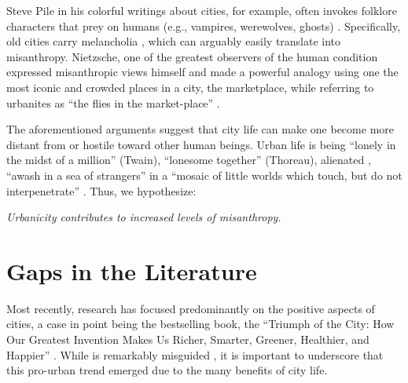 \documentclass[11pt, letterpaper]{article}
\begin{document}
\begin{spacing}{1.4}
Steve Pile in his colorful writings about cities, for example, often invokes
folklore characters that prey on humans (e.g., vampires, werewolves, ghosts)  \citep{pile05,pile05B,pile99}.
%
Specifically, old cities carry melancholia \citep{pile05B}, which can arguably easily translate into misanthropy.
%
Nietzsche, one of the greatest observers of the human condition expressed misanthropic views
himself \citep[e.g.,][]{avramenko2004zarathustra} %
 and made a powerful analogy using one the most iconic and crowded places in a city, the marketplace, while referring to urbanites as ``the flies in the market-place'' \citep{nietzsche05}. 

The aforementioned arguments suggest that city life can make one become more distant from or hostile toward other human beings. 
Urban life is being ``lonely in the midst of a million'' (Twain), ``lonesome together''
(Thoreau), alienated \citep{wirth38,nettler1957measure}, ``awash in a sea of strangers''
\citep[Merry cited in][p. 99]{wilson85} in a ``mosaic of little worlds which touch, but do not interpenetrate'' \citep[][p. 40]{park84}. Thus, we hypothesize:
 
{\indent\hspace{1in}\textit{Urbanicity contributes to increased levels of misanthropy.}}

\section*{Gaps in the Literature} 

Most recently, research has focused predominantly on the positive aspects of cities, a case in point being the bestselling book, the ``Triumph of the City: How Our Greatest Invention Makes Us Richer, Smarter, Greener, Healthier, and Happier'' \citep{glaeser11}. While \citet{glaeser11} is remarkably misguided  \citep{aokCityBook15,peck16}, it is important to underscore that this pro-urban trend emerged due to the many benefits of city life. 
   

\end{spacing}
\end{document}
